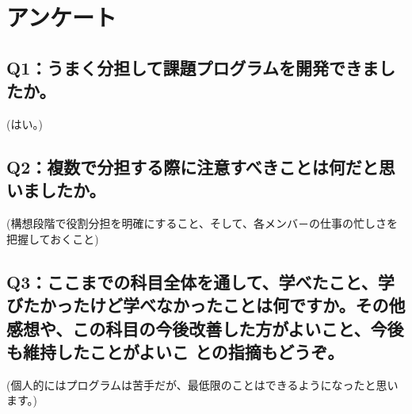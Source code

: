 \documentclass[12pt,a4j]{jarticle}
\begin{document}
\section{アンケート}

\subsection{Q1：うまく分担して課題プログラムを開発できましたか。}

(はい。)

\subsection{Q2：複数で分担する際に注意すべきことは何だと思いましたか。}

(構想段階で役割分担を明確にすること、そして、各メンバ－の仕事の忙しさを把握しておくこと)

\subsection{Q3：ここまでの科目全体を通して、学べたこと、学びたかったけど学べなかったことは何ですか。その他感想や、この科目の今後改善した方がよいこと、今後も維持したことがよいこ との指摘もどうぞ。}

(個人的にはプログラムは苦手だが、最低限のことはできるようになったと思います。)
\end{document}
